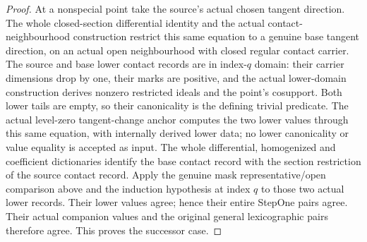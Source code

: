 \begin{proof}
At a nonspecial point take the source's actual chosen tangent direction. The
whole closed-section differential identity and the actual contact-neighbourhood
construction restrict this same equation to a genuine base tangent direction,
on an actual open neighbourhood with closed regular contact carrier. The
source and base lower contact records are in index-$q$ domain: their carrier
dimensions drop by one, their marks are positive, and the actual lower-domain
construction derives nonzero restricted ideals and the point's cosupport.
Both lower tails are empty, so their canonicality is the defining trivial
predicate. The actual level-zero tangent-change anchor computes the two lower
values through this same equation, with internally derived lower data; no lower
canonicality or value equality is accepted as input. The whole differential,
homogenized and coefficient dictionaries identify the base contact record with
the section restriction of the source contact record. Apply the genuine mask
representative/open comparison above and the induction hypothesis at index $q$
to those two actual lower records. Their lower values agree; hence their entire
StepOne pairs agree. Their actual companion values and the original general
lexicographic pairs therefore agree. This proves the successor case.
\end{proof}
